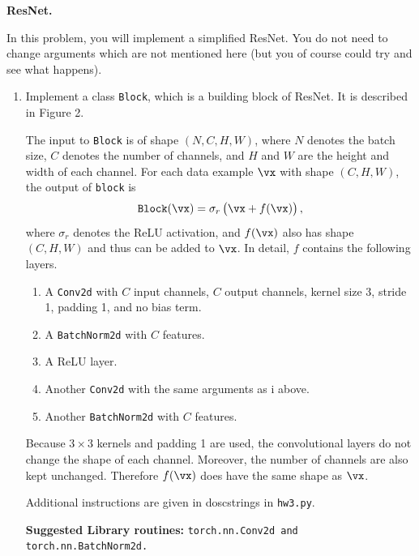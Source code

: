 \begin{enumerate}[font={\Large\bfseries},left=0pt]
  


\begin{Q}
    \textbf{\Large ResNet.}

    In this problem, you will implement a simplified ResNet. You do not need to change arguments which are not mentioned here (but you of course could try and see what happens).
    \begin{enumerate}
        \item Implement a class \texttt{Block}, which is a building block of ResNet. It is described in \citep{resnet} Figure 2.

        The input to \texttt{Block} is of shape $(N,C,H,W)$, where $N$ denotes the batch size, $C$ denotes the number of channels, and $H$ and $W$ are the height and width of each channel. For each data example $\vx$ with shape $(C,H,W)$, the output of \texttt{block} is
        \begin{align*}%
            \texttt{Block}(\vx)=\sigma_r\del{\vx+f(\vx)},
        \end{align*}
        where $\sigma_r$ denotes the ReLU activation, and $f(\vx)$ also has shape $(C,H,W)$ and thus can be added to $\vx$. In detail, $f$ contains the following layers.
        \begin{enumerate}
            \item A \texttt{Conv2d} with $C$ input channels, $C$ output channels, kernel size 3, stride 1, padding 1, and no bias term.
            \item A \texttt{BatchNorm2d} with $C$ features.
            \item A ReLU layer.
            \item Another \texttt{Conv2d} with the same arguments as i above.
            \item Another \texttt{BatchNorm2d} with $C$ features.
        \end{enumerate}
        Because $3\times3$ kernels and padding 1 are used, the convolutional layers do not change the shape of each channel. Moreover, the number of channels are also kept unchanged. Therefore $f(\vx)$ does have the same shape as $\vx$.

        Additional instructions are given in doscstrings in \texttt{hw3.py}.
        
        \textbf{Suggested Library routines:} \texttt{torch.nn.Conv2d and torch.nn.BatchNorm2d.}


\end{enumerate}
\end{Q}
\end{enumerate}
